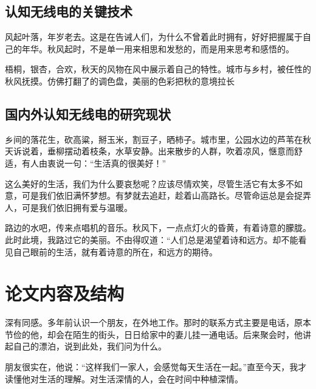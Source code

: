 \subsection{认知无线电的关键技术}
风起叶落，年岁老去。这是在告诫人们，为什么不曾着此时拥有，好好把握属于自己的年华。秋风起时，不是单一用来相思和发愁的，而是用来思考和感悟的。



梧桐，银杏，合欢，秋天的风物在风中展示着自己的特性。城市与乡村，被任性的秋风抚摸。仿佛打翻了的调色盘，美丽的色彩把秋的意境拉长
\subsection{国内外认知无线电的研究现状}
乡间的落花生，砍高粱，掰玉米，割豆子，晒柿子。城市里，公园水边的芦苇在秋天诉说着，垂柳摆动着枝条，水草安静。出来散步的人群，吹着凉风，惬意而舒适，有人由衷说一句：“生活真的很美好！”



这么美好的生活，我们为什么要哀愁呢？应该尽情欢笑，尽管生活它有太多不如意，可是我们依旧满怀梦想。有梦就去追赶，趁着山高路长。尽管命运总是会捉弄人，可是我们依旧拥有爱与温暖。



路边的水吧，传来点唱机的音乐。秋风下，一点点灯火的昏黄，有着诗意的朦胧。此时此境，我路过它的美丽。不由得叹道：“人们总是渴望着诗和远方。却不能看见自己眼前的生活，就有着诗意的所在，和远方的期待。
\section{论文内容及结构}
深有同感。多年前认识一个朋友，在外地工作。那时的联系方式主要是电话，原本节俭的他，却会在陌生的街头，日日给家中的妻儿挂一通电话。后来聚会时，他讲起自己的漂泊，说到此处，我们问为什么。



朋友很实在，他说：“这样我们一家人，会感觉每天生活在一起。”直至今天，我才读懂他对生活的理解。对生活深情的人，会在时间中种植深情。



